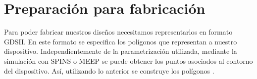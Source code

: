 \section{Preparación para fabricación}

Para poder fabricar nuestros diseños necesitamos representarlos en formato GDSII.
En este formato se especifica los polígonos que representan a nuestro dispositivo.
Independientemente de la parametrización utilizada, mediante la simulación con SPINS o MEEP se puede obtener los puntos asociados al contorno del dispositivo.
Así, utilizando lo anterior se construye los polígonos \citep{Bogaerts2018}.
